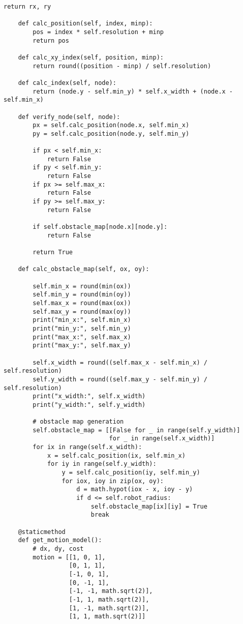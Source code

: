 \begin{lstlisting}[caption=Grid based Dijkstra planning (Atsushi's project)(\autoref{Pathfinding}), label=Atsushi]
        return rx, ry

    def calc_position(self, index, minp):
        pos = index * self.resolution + minp
        return pos

    def calc_xy_index(self, position, minp):
        return round((position - minp) / self.resolution)

    def calc_index(self, node):
        return (node.y - self.min_y) * self.x_width + (node.x - self.min_x)

    def verify_node(self, node):
        px = self.calc_position(node.x, self.min_x)
        py = self.calc_position(node.y, self.min_y)

        if px < self.min_x:
            return False
        if py < self.min_y:
            return False
        if px >= self.max_x:
            return False
        if py >= self.max_y:
            return False

        if self.obstacle_map[node.x][node.y]:
            return False

        return True

    def calc_obstacle_map(self, ox, oy):

        self.min_x = round(min(ox))
        self.min_y = round(min(oy))
        self.max_x = round(max(ox))
        self.max_y = round(max(oy))
        print("min_x:", self.min_x)
        print("min_y:", self.min_y)
        print("max_x:", self.max_x)
        print("max_y:", self.max_y)

        self.x_width = round((self.max_x - self.min_x) / self.resolution)
        self.y_width = round((self.max_y - self.min_y) / self.resolution)
        print("x_width:", self.x_width)
        print("y_width:", self.y_width)

        # obstacle map generation
        self.obstacle_map = [[False for _ in range(self.y_width)]
                             for _ in range(self.x_width)]
        for ix in range(self.x_width):
            x = self.calc_position(ix, self.min_x)
            for iy in range(self.y_width):
                y = self.calc_position(iy, self.min_y)
                for iox, ioy in zip(ox, oy):
                    d = math.hypot(iox - x, ioy - y)
                    if d <= self.robot_radius:
                        self.obstacle_map[ix][iy] = True
                        break

    @staticmethod
    def get_motion_model():
        # dx, dy, cost
        motion = [[1, 0, 1],
                  [0, 1, 1],
                  [-1, 0, 1],
                  [0, -1, 1],
                  [-1, -1, math.sqrt(2)],
                  [-1, 1, math.sqrt(2)],
                  [1, -1, math.sqrt(2)],
                  [1, 1, math.sqrt(2)]]


\end{lstlisting}
